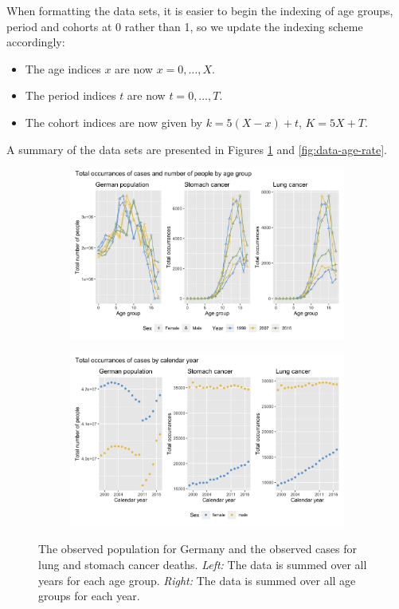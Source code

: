 When formatting the data sets, it is easier to begin the indexing of age groups, period and cohorts at 0 rather than 1, so we update the indexing scheme accordingly:
\begin{itemize}
    \item The age indices $x$ are now $x = 0,\ldots,X$.
    \item The period indices $t$ are now $t = 0, \ldots, T$.
    \item The cohort indices are now given by $k = 5(X - x) + t$, $K = 5X + T$.
\end{itemize}
A summary of the data sets are presented in Figures \ref{fig:data-total} and \ref{fig:data-age-rate}. 
\begin{figure}
    \centering
    \begin{subfigure}[b]{.45\linewidth}
        \includegraphics[width=\linewidth]{real-data/real-data-univariate/Figures/data-age-total.png}
    \end{subfigure}
    \begin{subfigure}[b]{.45\linewidth}
        \includegraphics[width=\linewidth]{real-data/real-data-univariate/Figures/data-year-total.png}
    \end{subfigure}
    \caption{The observed population for Germany and the observed cases for lung and stomach cancer deaths. \textit{Left:} The data is summed over all years for each age group. \textit{Right:} The data is summed over all age groups for each year.}
    \label{fig:data-total}
\end{figure}


